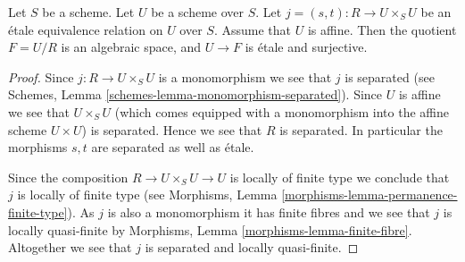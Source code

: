 %
\begin{lemma}
\label{lemma-presentation-quasi-compact}
Let $S$ be a scheme.
Let $U$ be a scheme over $S$.
Let $j = (s, t) : R \to U \times_S U$
be an \'etale equivalence relation on $U$ over $S$.
Assume that $U$ is affine. Then the quotient $F = U/R$
is an algebraic space, and $U \to F$ is \'etale and surjective.
\end{lemma}

\begin{proof}
Since $j : R \to U \times_S U$ is a monomorphism we see that $j$ is separated
(see Schemes, Lemma \ref{schemes-lemma-monomorphism-separated}).
Since $U$ is affine we see that $U \times_S U$
(which comes equipped with a monomorphism into the affine scheme
$U \times U$) is separated. Hence we see that $R$ is separated.
In particular the morphisms $s, t$ are separated as well as \'etale.

\medskip\noindent
Since the composition $R \to U \times_S U \to U$ is
locally of finite type we conclude that
$j$ is locally of finite type (see
Morphisms, Lemma \ref{morphisms-lemma-permanence-finite-type}).
As $j$ is also a monomorphism it has finite fibres and
we see that $j$ is locally quasi-finite by
Morphisms, Lemma \ref{morphisms-lemma-finite-fibre}.
Altogether we see that $j$ is separated and locally quasi-finite.


\end{proof}

